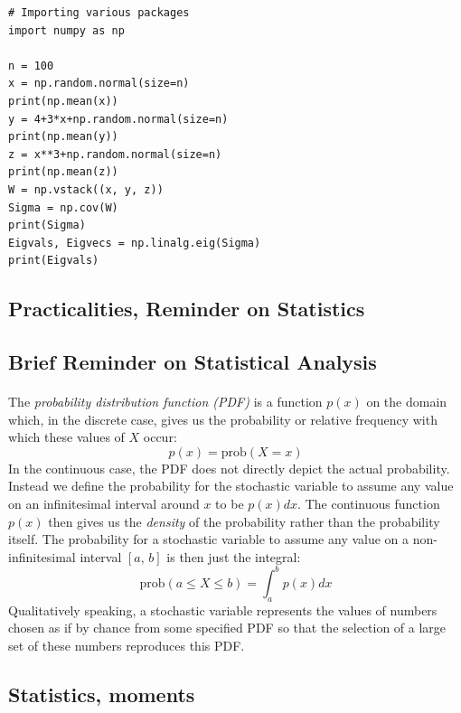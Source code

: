 \documentclass[%
oneside,                 %
final,                   %
10pt]{article}
\begin{document}
\begin{verbatim}
# Importing various packages
import numpy as np

n = 100
x = np.random.normal(size=n)
print(np.mean(x))
y = 4+3*x+np.random.normal(size=n)
print(np.mean(y))
z = x**3+np.random.normal(size=n)
print(np.mean(z))
W = np.vstack((x, y, z))
Sigma = np.cov(W)
print(Sigma)
Eigvals, Eigvecs = np.linalg.eig(Sigma)
print(Eigvals)
\end{verbatim}


\subsection*{Practicalities, Reminder on Statistics}



\subsection*{Brief Reminder on Statistical Analysis}

\paragraph{}
The \emph{probability distribution function (PDF)} is a function
$p(x)$ on the domain which, in the discrete case, gives us the
probability or relative frequency with which these values of $X$ occur:
\[
p(x) = \mathrm{prob}(X=x)
\]
In the continuous case, the PDF does not directly depict the
actual probability. Instead we define the probability for the
stochastic variable to assume any value on an infinitesimal interval
around $x$ to be $p(x)dx$. The continuous function $p(x)$ then gives us
the \emph{density} of the probability rather than the probability
itself. The probability for a stochastic variable to assume any value
on a non-infinitesimal interval $[a,\,b]$ is then just the integral:
\[
\mathrm{prob}(a\leq X\leq b) = \int_a^b p(x)dx
\]
Qualitatively speaking, a stochastic variable represents the values of
numbers chosen as if by chance from some specified PDF so that the
selection of a large set of these numbers reproduces this PDF.




\subsection*{Statistics, moments}
\end{document}
